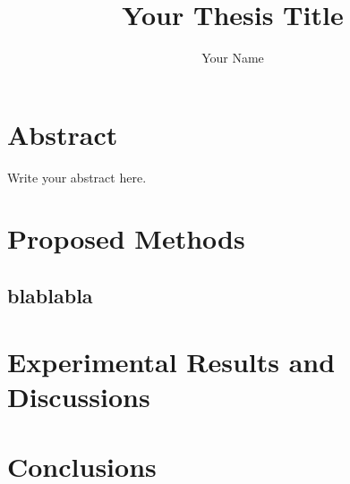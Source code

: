 \documentclass[10pt,a4j,twocolumn]{jsarticle}
\title{Your Thesis Title}
\author{Your Name}
\begin{document}
\setlength{\abovedisplayskip}{0pt}
\setlength{\belowdisplayskip}{0pt}
\renewcommand{\baselinestretch}{0.9}
\maketitle

\section{Abstract}
Write your abstract here.\cite{RSL}

\section{Proposed Methods}

\subsection{\rmfamily blablabla}

\section{Experimental Results and Discussions}

\section{Conclusions}

\small


\end{document}
